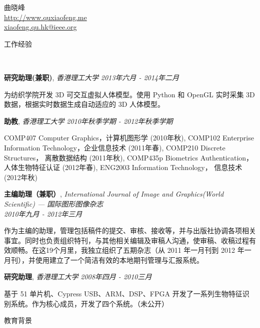 \documentclass{article}
\newenvironment{changemargin}[2]{%
  \begin{list}{}{%
    \setlength{\topsep}{0pt}%
    \setlength{\leftmargin}{#1}%
    \setlength{\rightmargin}{#2}%
    \setlength{\listparindent}{\parindent}%
    \setlength{\itemindent}{\parindent}%
    \setlength{\parsep}{\parskip}%
  }%
  \item[]}{\end{list}
}
\newcommand{\lineover}{
	\begin{changemargin}{-0.05in}{-0.05in}
		\vspace*{-8pt}
		\hrulefill \\
		\vspace*{-2pt}
	\end{changemargin}
}
\newcommand{\header}[1]{
	\begin{changemargin}{-0.5in}{-0.5in}
		\scshape{#1}\\
  	\lineover
	\end{changemargin}
}
\newcommand{\contact}[3]{
	\begin{changemargin}{-0.5in}{-0.5in}
		\begin{center}
			{\Large \scshape {#1}}\\ \smallskip
      {\url{#2}}\\ \smallskip 
      {\href{mailto:#3}{#3}}\\ \smallskip
		\end{center}
	\end{changemargin}
}
\newcommand{\jobtitle}[3]{
	\textbf{#1}, \emph{#2} \hfill \emph{#3}\\
}
\newcommand{\jobdescription}[1]{
	\begin{changemargin}{0.15in}{0.15in}
    \smallskip
		{#1}
    \medskip
	\end{changemargin}
}
\newenvironment{body} {
	\vspace*{-16pt}
	\begin{changemargin}{-0.25in}{-0.5in}
  }	
	{\end{changemargin}
}
\begin{document}
\contact{曲晓峰}{http://www.quxiaofeng.me}{xiaofeng.qu.hk@ieee.org}


\header{工作经验}

\begin{body}
  \vspace{14pt}

    \jobtitle{研究助理(兼职)}{香港理工大学}{2013年六月 - 2014年二月}
    \jobdescription{
        为纺织学院开发 3D 可交互虚拟人体模型。使用 Python 和 OpenGL 实时采集 3D 数据，根据实时数据生成自动适应的 3D 人体模型。
    }

    \jobtitle{助教}{香港理工大学}{2010年秋季学期 - 2012年秋季学期}
    \jobdescription {
        COMP407 Computer Graphics，计算机图形学 (2010年秋),
        COMP102 Enterprise Information Technology，企业信息技术 (2011年春), 
        COMP210 Discrete Structures， 离散数据结构 (2011年秋),
        COMP435p Biometrics Authentication， 人体生物特征认证 (2012年春), 
        ENG2003 Information Technology， 信息技术 (2012年秋)
    }

    \jobtitle{主编助理（兼职）}{International Journal of Image and Graphics(World Scientific) --- 国际图形图像杂志\\}{2010年九月 - 2012年三月}
    \jobdescription{
        作为主编的助理，管理包括稿件的提交、审核、接收等，并与出版社协调各项相关事宜。同时也负责组织特刊，与其他相关编辑及审稿人沟通，使审稿、收稿过程有效顺畅。在这19个月里，我独立组织了五期杂志（从 2011 年一月刊到 2012 年一月刊），并使用建立了一个简洁有效的本地期刊管理与汇报系统。
    }

	\jobtitle{研究助理}{香港理工大学}{2008年四月 - 2010三月}
    \jobdescription{
        基于 51 单片机、Cypress USB、ARM、DSP、FPGA 开发了一系列生物特征识别系统。作为核心成员，开发了四个系统。（未公开）
    }

\end{body}

\medskip


\header{教育背景}
\end{document}
